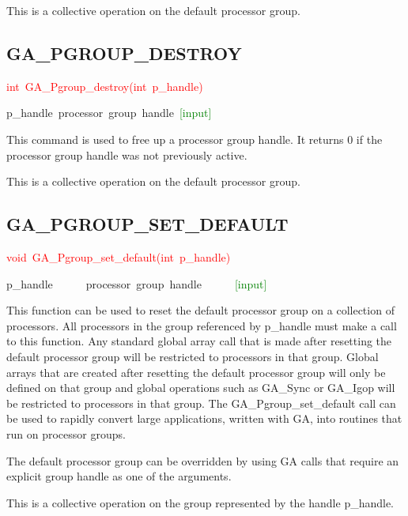 This is a collective operation on the default processor group. 


\subsection*{\label{sub:GA_PGROUP_DESTROY}GA\_PGROUP\_DESTROY}
\begin{lyxcode}
\textcolor{red}{int~GA\_Pgroup\_destroy(int~p\_handle)}



p\_handle~processor~group~handle~\textcolor{green}{{[}input{]}}
\end{lyxcode}
This command is used to free up a processor group handle. It returns
0 if the processor group handle was not previously active.

This is a collective operation on the default processor group. 


\subsection*{\label{sub:GA_PGROUP_SET_DEFAULT}GA\_PGROUP\_SET\_DEFAULT}
\begin{lyxcode}
\textcolor{red}{void~GA\_Pgroup\_set\_default(int~p\_handle)}



p\_handle~~~~~~processor~group~handle~~~~~~\textcolor{green}{{[}input{]}}
\end{lyxcode}
This function can be used to reset the default processor group on
a collection of processors. All processors in the group referenced
by p\_handle must make a call to this function. Any standard global
array call that is made after resetting the default processor group
will be restricted to processors in that group. Global arrays that
are created after resetting the default processor group will only
be defined on that group and global operations such as GA\_Sync or
GA\_Igop will be restricted to processors in that group. The GA\_Pgroup\_set\_default
call can be used to rapidly convert large applications, written with
GA, into routines that run on processor groups.

The default processor group can be overridden by using GA calls that
require an explicit group handle as one of the arguments.

This is a collective operation on the group represented by the handle
p\_handle. 



